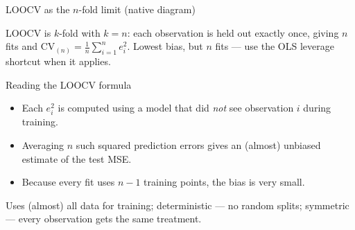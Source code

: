 \documentclass[aspectratio=169,11pt]{beamer}
\begin{document}
\begin{frame}{LOOCV as the $n$-fold limit (native diagram)}
  \begin{center}
  \end{center}
  \begin{takeaway}
    LOOCV is $k$-fold with $k=n$: each observation is held out exactly once, giving $n$ fits and $\mathrm{CV}_{(n)}=\tfrac1n\sum_{i=1}^n e_i^2$. Lowest bias, but $n$ fits --- use the OLS leverage shortcut when it applies.
  \end{takeaway}
\end{frame}

\begin{frame}{Reading the LOOCV formula}
  \begin{readme}
    \begin{itemize}
      \item Each $e_i^2$ is computed using a model that did
            \emph{not} see observation $i$ during training.
      \item Averaging $n$ such squared prediction errors gives an
            (almost) unbiased estimate of the test MSE.
      \item Because every fit uses $n - 1$ training points, the bias
            is very small.
    \end{itemize}
  \end{readme}
  \begin{takeaway}[Pros]
    Uses (almost) all data for training; deterministic --- no random
    splits; symmetric --- every observation gets the same treatment.
  \end{takeaway}
\end{frame}
\end{document}
